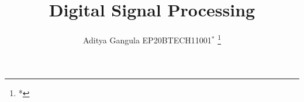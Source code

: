 \documentclass[journal,12pt,twocolumn]{IEEEtran}
\begin{document}

\def\putbox#1#2#3{\makebox[0in][l]{\makebox[#1][l]{}\raisebox{\baselineskip}[0in][0in]{\raisebox{#2}[0in][0in]{#3}}}}
     \def\rightbox#1{\makebox[0in][r]{#1}}
     \def\centbox#1{\makebox[0in]{#1}}
     \def\topbox#1{\raisebox{-\baselineskip}[0in][0in]{#1}}
     \def\midbox#1{\raisebox{-0.5\baselineskip}[0in][0in]{#1}}

\vspace{3cm}

\title{ 
Digital Signal Processing
}


%
%
%

\author{ Aditya Gangula EP20BTECH11001$^{*}$ %
\thanks{* }%
}
% 
%
\end{document}
